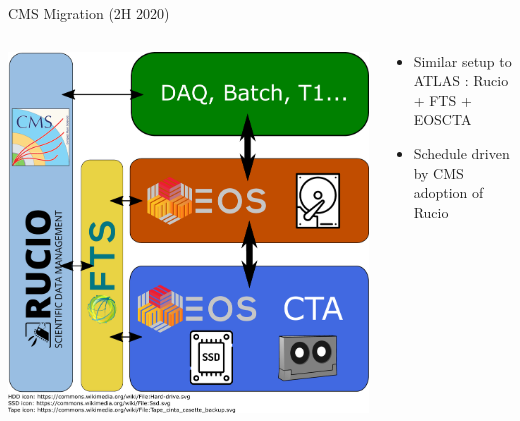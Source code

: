\documentclass[aspectratio=1610]{beamer}
\begin{document}
\begin{frame}{CMS Migration (2H 2020)}
\begin{columns}
	\begin{column}{0.4\textwidth}
		\begin{center}
		  \includegraphics[width=\textwidth]{images/CTA_Deployment_CMS.pdf}
		\end{center}
	\end{column}
	\begin{column}{0.55\textwidth}
		\begin{itemize}
		  \item Similar setup to ATLAS : Rucio + FTS + EOSCTA
        \item Schedule driven by CMS adoption of Rucio
		\end{itemize}
	\end{column}
\end{columns}
\end{frame}
\end{document}
